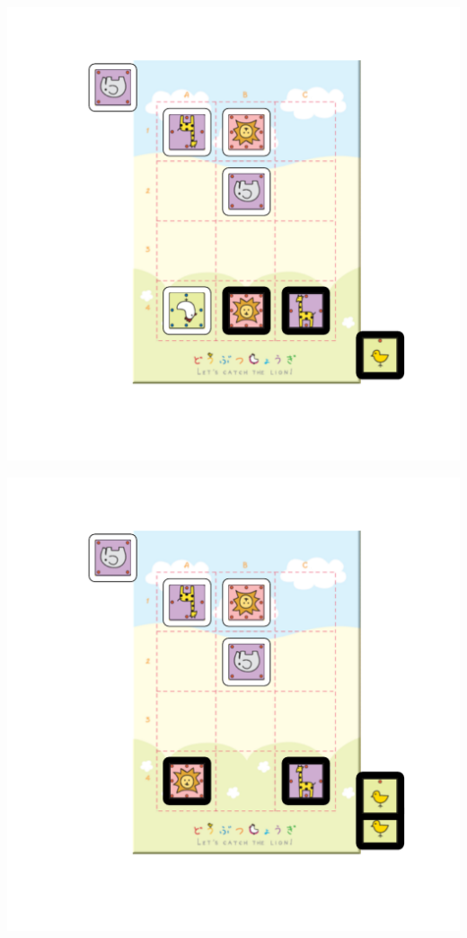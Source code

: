 \documentclass{beamer}
\begin{document}
\begin{frame}
\includegraphics[scale = 0.6, clip=true, trim=1in 1in 0in 0.5in]{example6.pdf}
\end{frame}
\begin{frame}
\includegraphics[scale = 0.6, clip=true, trim=1in 1in 0in 0.5in]{example7.pdf}
\end{frame}
\end{document}
